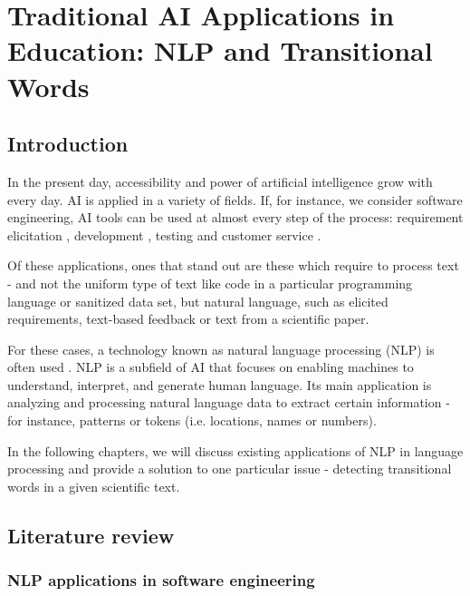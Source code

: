 \chapter{Traditional AI Applications in Education: NLP and Transitional Words}
\label{chap:Traditional_AI_Applications_in_Education:_NLP_and_Transitional_Words}









\section{Introduction}

In the present day, accessibility and power of artificial intelligence grow with every day. AI is applied in a variety of fields. If, for instance, we consider software engineering, AI tools can be used at almost every step of the process: requirement elicitation \cite{intro-1}, development \cite{intro-2}, testing \cite{intro-3} and customer service \cite{intro-4}. 

Of these applications, ones that stand out are these which require to process text - and not the uniform type of text like code in a particular programming language or sanitized data set, but natural language, such as elicited requirements, text-based feedback or text from a scientific paper. 

For these cases, a technology known as natural language processing (NLP) is often used \cite{intro-5}. NLP is a subfield of AI that focuses on enabling machines to understand, interpret, and generate human language. Its main application is analyzing and processing natural language data to extract certain information - for instance, patterns or tokens (i.e. locations, names or numbers). 

In the following chapters, we will discuss existing applications of NLP in language processing and provide a solution to one particular issue - detecting transitional words in a given scientific text. 

\section{Literature review}

\subsection{NLP applications in software engineering}

